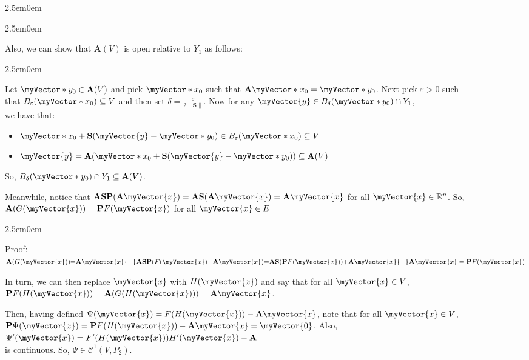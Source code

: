 \documentclass{book}
\newcommand{\hFour}{%
   \color{Cerulean}
   \fontsize{12}{14}\selectfont%
}
\newenvironment{myIndent}{%
   \begin{adjustwidth}{2.5em}{0em}%
}{%
   \end{adjustwidth}%
}
\newcommand{\retTwo}{\hfill\bigbreak}
\newcommand{\mVec}[1]{\myVector{#1}}
\newcommand{\mVecAst}[1]{\myVector*{#1}}
\newcommand{\mMat}[1]{\mathbf{#1}}
\begin{document}
{\begin{myIndent}
{\begin{myIndent}
      Also, we can show that $\mMat{A}(V)$ is open relative to $Y_1$ as follows:
      {\begin{myIndent}\hFour
         Let $\mVecAst{y}_0 \in \mMat{A}(V)$ and pick $\mVecAst{x}_0$ such that $\mMat{A}\mVecAst{x}_0 = \mVecAst{y}_0$. Next pick $\varepsilon > 0$ such\\ [2pt] that $B_\varepsilon(\mVecAst{x}_0) \subseteq V$ and then set $\delta = \frac{\varepsilon}{2\|\mMat{S}\|}$. Now for any $\mVec{y} \in B_\delta(\mVecAst{y}_0) \cap Y_1$,\\ we have that:
         \begin{itemize}
            \item $\mVecAst{x}_0 + \mMat{S}(\mVec{y} - \mVecAst{y}_0) \in B_\varepsilon(\mVecAst{x}_0) \subseteq V$
            \item $\mVec{y} = \mMat{A}(\mVecAst{x}_0 + \mMat{S}(\mVec{y} - \mVecAst{y}_0)) \subseteq \mMat{A}(V)$\retTwo
         \end{itemize}

         So, $B_\delta(\mVecAst{y}_0) \cap Y_1 \subseteq \mMat{A}(V)$.\retTwo
      \end{myIndent}}

      Meanwhile, notice that $\mMat{ASP}(\mMat{A}\mVec{x}) = \mMat{AS}(\mMat{A}\mVec{x}) = \mMat{A}\mVec{x}$ for all $\mVec{x} \in \mathbb{R}^n$. So,\\ $\mMat{A}(G(\mVec{x})) = \mMat{P}F(\mVec{x})$ for all $\mVec{x} \in E$ 
      
      {\begin{myIndent}\hFour
         Proof:\\
         $\mMat{A}(G(\mVec{x})) {=} \mMat{A}\mVec{x} {+} \mMat{ASP}(F(\mVec{x}) {-} \mMat{A}\mVec{x}) {=} \mMat{AS}(\mMat{P}F(\mVec{x})) {+} \mMat{A}\mVec{x} {-} \mMat{A}{\mVec{x}} = \mMat{P}F(\mVec{x})$\retTwo
      \end{myIndent}}

      In turn, we can then replace $\mVec{x}$ with $H(\mVec{x})$ and say that for all $\mVec{x} \in V$,\\ $\mMat{P}F(H(\mVec{x})) = \mMat{A}(G(H(\mVec{x}))) = \mMat{A}\mVec{x}$.\newpage
      
      Then, having defined $\Psi(\mVec{x}) = F(H(\mVec{x})) - \mMat{A}\mVec{x}$, note that for all $\mVec{x} \in V$,\\ $\mMat{P} \Psi(\mVec{x}) = \mMat{P}F(H(\mVec{x})) - \mMat{A}\mVec{x} = \mVec{0}$. Also, $\Psi^\prime(\mVec{x}) = F^\prime(H(\mVec{x}))H^\prime(\mVec{x}) - \mMat{A}$\\ is continuous. So, $\Psi \in \mathscr{C}^1(V, P_2)$.\\ [6pt]


\end{myIndent}}
\end{myIndent}}
\end{document}
